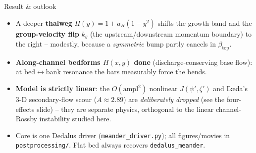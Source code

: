 \documentclass[aspectratio=169,10pt]{beamer}
\newcommand{\hl}[2]{\textcolor{#1}{\textbf{#2}}}
\newcommand{\pp}{\psi'}
\newcommand{\zp}{\zeta'}
\newcommand{\bt}{\beta_{\mathrm{top}}}
\begin{document}
\begin{frame}{Result \& outlook}
\begin{itemize}
  \item A deeper \hl{cVeloc}{thalweg} $H(y)=1+a_H(1-y^2)$ shifts the growth band and the
  \hl{cMom}{group-velocity flip} $k_g$ (the upstream/downstream momentum boundary) to
  the right -- modestly, because a \emph{symmetric} bump partly cancels in $\bt$.
  \item \hl{cGrowth}{Along-channel bedforms $H(x,y)$ done} (discharge-conserving base flow):
  at bed$\leftrightarrow$bank resonance the bars measurably force the bends.
  \item \hl{cVeloc}{Model is strictly linear}: the $O(\text{ampl}^2)$ nonlinear $J(\pp,\zp)$
  and Ikeda's 3-D secondary-flow scour ($A\approx2.89$) are \emph{deliberately dropped}
  (see the four-effects slide) -- they are separate physics, orthogonal to the linear
  channel-Rossby instability studied here.
  \item Core is one Dedalus driver (\texttt{meander\_driver.py}); all figures/movies in
  \texttt{postprocessing/}.  Flat bed always recovers \texttt{dedalus\_meander}.
\end{itemize}
\end{frame}
\end{document}
